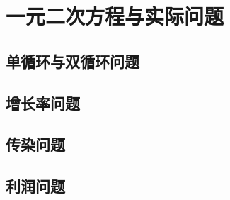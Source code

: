 \section{一元二次方程与实际问题}

\subsection{单循环与双循环问题}

\subsection{增长率问题}


\subsection{传染问题}

\subsection{利润问题}